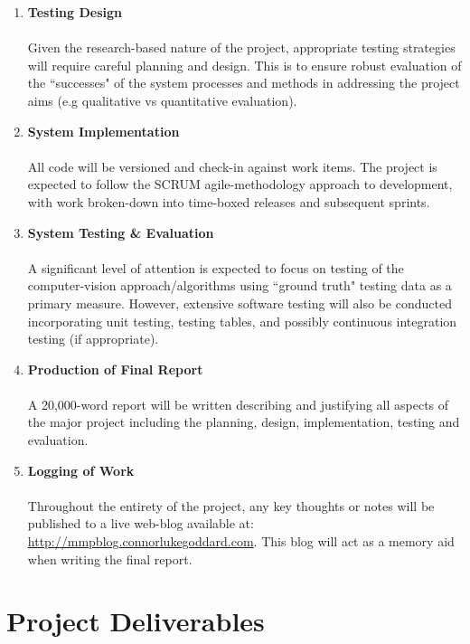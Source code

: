 \documentclass[10pt,fleqn,twoside]{article}
\begin{document}
\begin{enumerate}
	\item \textbf{Testing Design} \\\\ Given the research-based nature of the project, appropriate testing strategies will require careful planning and design. This is to ensure robust evaluation of the ``successes" of the system processes and methods in addressing the project aims (e.g qualitative vs quantitative evaluation).
	
	\item \textbf{System Implementation} \\\\ All code will be versioned and check-in against work items. The project is expected to follow the SCRUM agile-methodology approach to development, with work broken-down into time-boxed releases and subsequent sprints. 
	
	\item \textbf{System Testing \& Evaluation} \\\\ A significant level of attention is expected to focus on testing of the computer-vision approach/algorithms using ``ground truth" testing data as a primary measure. However, extensive software testing will also be conducted incorporating unit testing, testing tables, and possibly continuous integration testing (if appropriate).
	
	\item \textbf{Production of Final Report} \\\\ A 20,000-word report will be written describing and justifying all aspects of the major project including the planning, design, implementation, testing and evaluation.
	
	\item \textbf{Logging of Work} \\\\ Throughout the entirety of the project, any key thoughts or notes will be published to a live web-blog available at: \url{http://mmpblog.connorlukegoddard.com}. This blog will act as a memory aid when writing the final report.

\end{enumerate}


\section{Project Deliverables}
\end{document}
